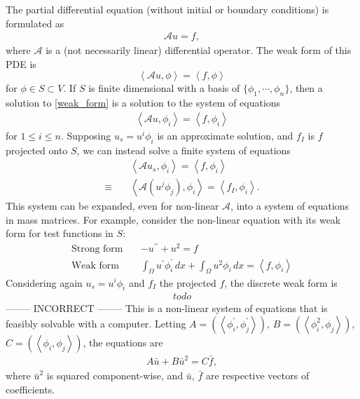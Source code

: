 \documentclass[11pt,a4paper]{memoir}
\newcommand{\pr}{\prime}
\newcommand{\ppr}{{\prime\prime}}
\newcommand{\inner}[1]{\left<#1\right>}
\newcommand{\fancyA}{\mathcal{A}}
\begin{document}
The partial differential equation (without initial or boundary conditions) is formulated as
\begin{align*}
    \fancyA u = f,
\end{align*}
where $\fancyA$ is a (not necessarily linear) differential operator.
The weak form of this PDE is
\begin{equation}\label{weak_form}
    \inner{\fancyA u, \phi} = \inner{f, \phi}
\end{equation}
for $\phi \in S \subset V$. If $S$ is finite dimensional with a basis of $\{\phi_1,\cdots,\phi_n\}$,
then a solution to \eqref{weak_form} is a solution to the system of equations
\begin{align*}
    \inner{\fancyA u, \phi_i} = \inner{f, \phi_i}
\end{align*}
for $1 \leq i \leq n$. Supposing $u_s = u^i \phi_i$ is an approximate solution, and $f_I$ is $f$ projected onto $S$, we can instead solve a finite system of equations
\begin{align*}
    & \inner{\fancyA u_s, \phi_i} = \inner{f, \phi_i} \\
    \equiv\quad& \inner{\fancyA(u^j \phi_j), \phi_i} = \inner{f_I, \phi_i}.
\end{align*}
This system can be expanded, even for non-linear $\fancyA$, into a system of equations in mass matrices.
For example, consider the non-linear equation with its weak form for test functions in $S$:
\begin{align*}
    \text{Strong form}\quad& -u^\ppr + u^2 = f \\
    \text{Weak form}\quad& \int_\Omega u^\pr \phi_i^\pr\, dx + \int_\Omega u^2 \phi_i\, dx = \inner{f, \phi_i}
\end{align*}
Considering again $u_s = u^i \phi_i$ and $f_I$ the projected $f$, the discrete weak form is
\begin{align*}
    todo
\end{align*}
--------
INCORRECT
--------
This is a non-linear system of equations that is feasibly solvable with a computer.
Letting $A = \left(\inner{\phi^\pr_i, \phi^\pr_j}\right)$, $B = \left(\inner{\phi_i^2, \phi_j}\right)$, $C = \left(\inner{\phi_i, \phi_j}\right)$, the equations are
\begin{align*}
    A\bar{u} + B\bar{u}^2 = C\bar{f},
\end{align*}
where $\bar{u}^2$ is squared component-wise, and $\bar{u}$, $\bar{f}$ are respective vectors of coefficients.
\end{document}
